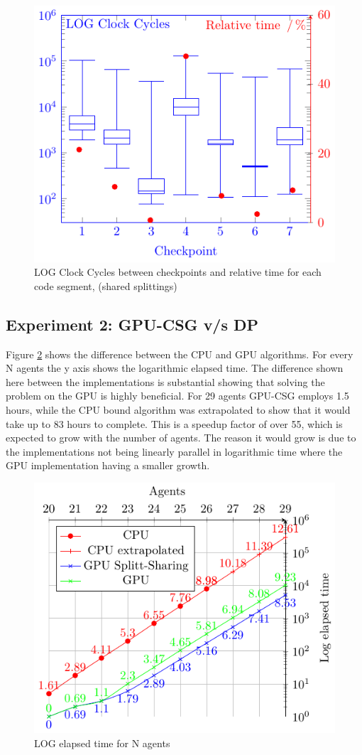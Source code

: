 \documentclass{llncs}
\begin{document}
\begin{figure}[htbp]\centering
\includegraphics[width=0.8\columnwidth]{fig2cycles}
\caption{LOG Clock Cycles between checkpoints and relative time for each code segment, (shared splittings)\label{splitt}}
\end{figure}

\subsection{Experiment 2: GPU-CSG v/s DP}
Figure \ref{time} shows the difference between the CPU and GPU algorithms.
For every N agents the y axis shows the logarithmic elapsed time. The difference shown here between the implementations is substantial showing
that solving the problem on the GPU is highly beneficial. For 29 agents GPU-CSG employs 1.5 hours, while the CPU bound algorithm was extrapolated to show that it would take up to 83 hours to complete. This is a speedup factor of over 55, which is expected to grow with the number of agents. The reason it would grow is due to the implementations not being linearly parallel in logarithmic time where the GPU implementation having a smaller growth.

\begin{figure}[htbp]\centering
\includegraphics[width=0.8\columnwidth]{fig1cycles}
\caption{LOG elapsed time for N agents\label{time}}
\end{figure}
\end{document}
